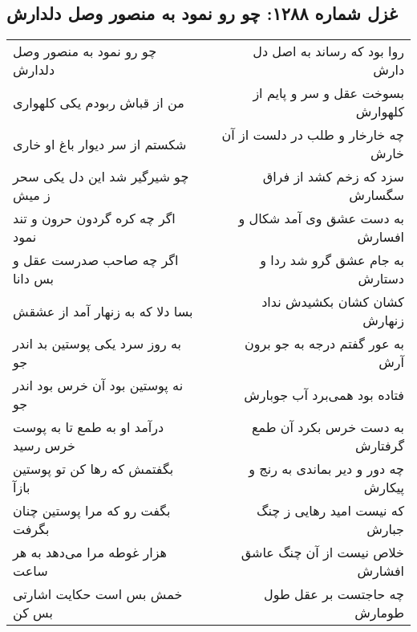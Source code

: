 \begin{center}
\section*{غزل شماره ۱۲۸۸: چو رو نمود به منصور وصل دلدارش}
\label{sec:1288}
\begin{longtable}{l p{0.5cm} r}
چو رو نمود به منصور وصل دلدارش
&&
روا بود که رساند به اصل دل دارش
\\
من از قباش ربودم یکی کلهواری
&&
بسوخت عقل و سر و پایم از کلهوارش
\\
شکستم از سر دیوار باغ او خاری
&&
چه خارخار و طلب در دلست از آن خارش
\\
چو شیرگیر شد این دل یکی سحر ز میش
&&
سزد که زخم کشد از فراق سگسارش
\\
اگر چه کره گردون حرون و تند نمود
&&
به دست عشق وی آمد شکال و افسارش
\\
اگر چه صاحب صدرست عقل و بس دانا
&&
به جام عشق گرو شد ردا و دستارش
\\
بسا دلا که به زنهار آمد از عشقش
&&
کشان کشان بکشیدش نداد زنهارش
\\
به روز سرد یکی پوستین بد اندر جو
&&
به عور گفتم درجه به جو برون آرش
\\
نه پوستین بود آن خرس بود اندر جو
&&
فتاده بود همی‌برد آب جوبارش
\\
درآمد او به طمع تا به پوست خرس رسید
&&
به دست خرس بکرد آن طمع گرفتارش
\\
بگفتمش که رها کن تو پوستین بازآ
&&
چه دور و دیر بماندی به رنج و پیکارش
\\
بگفت رو که مرا پوستین چنان بگرفت
&&
که نیست امید رهایی ز چنگ جبارش
\\
هزار غوطه مرا می‌دهد به هر ساعت
&&
خلاص نیست از آن چنگ عاشق افشارش
\\
خمش بس است حکایت اشارتی بس کن
&&
چه حاجتست بر عقل طول طومارش
\\
\end{longtable}
\end{center}
